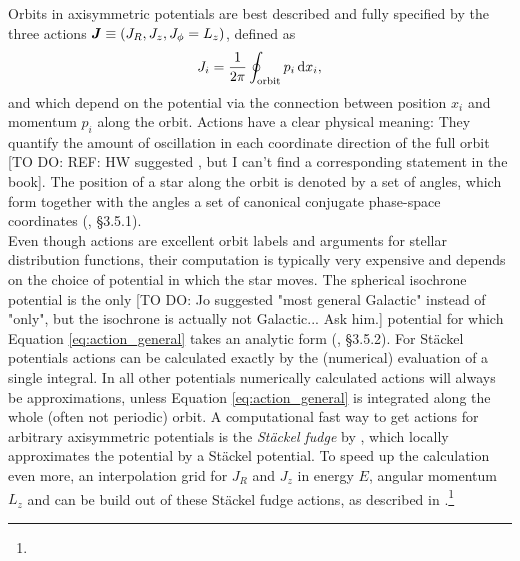 
Orbits in axisymmetric potentials are best described and fully specified by the three actions $\boldsymbol{J} \equiv (J_R, J_z, J_\phi=L_z)$, defined as
\begin{equation}
J_i = \frac{1}{2\pi} \oint_\text{orbit} p_i \mathop{}\!\mathrm{d} x_i, \label{eq:action_general}
\end{equation}
and which depend on the potential via the connection between position $x_i$ and momentum $p_i$ along the orbit. Actions have a clear physical meaning: They quantify the amount of oscillation in each coordinate direction of the full orbit [TO DO: REF: HW suggested \citet{2008gady.book.....B}, but I can't find a corresponding statement in the book]. The position of a star along the orbit is denoted by a set of angles, which form together with the angles a set of canonical conjugate phase-space coordinates (\citealt{2008gady.book.....B}, \S 3.5.1). \\

Even though actions are excellent orbit labels and arguments for stellar distribution functions, their computation is typically very expensive and depends on the choice of potential in which the star moves. The spherical isochrone potential \citep{1959AnAp...22..126H} is the only [TO DO: Jo suggested "most general Galactic" instead of "only", but the isochrone is actually not Galactic... Ask him.] potential for which Equation \ref{eq:action_general} takes an analytic form (\citealt{2008gady.book.....B}, \S 3.5.2). For St\"{a}ckel potentials actions can be calculated exactly by the (numerical) evaluation of a single integral. In all other potentials numerically calculated actions will always be approximations, unless Equation \ref{eq:action_general} is integrated along the whole (often not periodic) orbit.  A computational fast way to get actions for arbitrary axisymmetric potentials is the \emph{St\"{a}ckel fudge} by \citet{2012MNRAS.426.1324B}, which locally approximates the potential by a St\"{a}ckel potential. To speed up the calculation even more, an interpolation grid for $J_R$ and $J_z$ in energy $E$, angular momentum $L_z$ and  can be build out of these St\"{a}ckel fudge actions, as described in \citet{bov15}.\footnote{} \\

